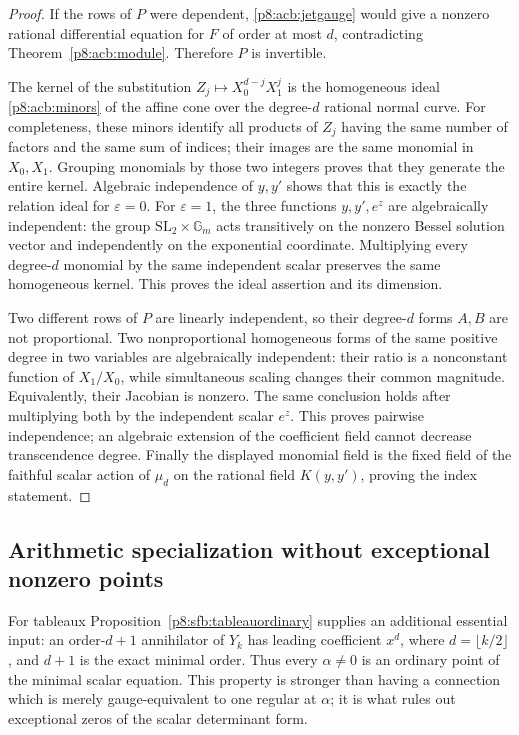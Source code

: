 \documentclass[11pt,a4paper]{article}
\theoremstyle{definition}
\theoremstyle{remark}
\numberwithin{equation}{section}
\begin{document}
\begin{proof}
If the rows of $P$ were dependent, \eqref{p8:acb:jetgauge} would give
a nonzero rational differential equation for $F$ of order at most
$d$, contradicting Theorem~\ref{p8:acb:module}.  Therefore $P$ is
invertible.

The kernel of the substitution
$Z_j\mapsto X_0^{d-j}X_1^j$ is the homogeneous ideal
\eqref{p8:acb:minors} of the affine cone over the degree-$d$ rational
normal curve.  For completeness, these minors identify all
products of $Z_j$ having the same number of factors and the same
sum of indices; their images are the same monomial in $X_0,X_1$.
Grouping monomials by those two integers proves that they generate
the entire kernel.  Algebraic independence of $y,y'$ shows that
this is exactly the relation ideal for $\varepsilon=0$.
For $\varepsilon=1$, the three functions $y,y',e^z$ are
algebraically independent: the group
$\mathrm{SL}_2\times\mathbb G_m$ acts transitively on the
nonzero Bessel solution vector and independently on the
exponential coordinate.  Multiplying every degree-$d$ monomial
by the same independent scalar preserves the same homogeneous
kernel.  This proves the ideal assertion and its dimension.

Two different rows of $P$ are linearly independent, so their
degree-$d$ forms $A,B$ are not proportional.  Two nonproportional
homogeneous forms of the same positive degree in two variables
are algebraically independent: their ratio is a nonconstant
function of $X_1/X_0$, while simultaneous scaling changes their
common magnitude.  Equivalently, their Jacobian is nonzero.
The same conclusion holds after multiplying both by the
independent scalar $e^z$.  This proves pairwise independence;
an algebraic extension of the coefficient field cannot decrease
transcendence degree.  Finally the displayed monomial field is
the fixed field of the faithful scalar action of $\mu_d$ on
the rational field $K(y,y')$, proving the index statement.
\end{proof}

\subsection{Arithmetic specialization without exceptional nonzero points}

For tableaux Proposition~\ref{p8:sfb:tableauordinary} supplies an
additional essential input: an order-$d+1$ annihilator of $Y_k$
has leading coefficient $x^d$, where $d=\lfloor k/2\rfloor$,
and $d+1$ is the exact minimal order.  Thus every
$\alpha\ne0$ is an ordinary point of the minimal scalar equation.
This property is stronger than having a connection which is
merely gauge-equivalent to one regular at $\alpha$; it is what
rules out exceptional zeros of the scalar determinant form.
\end{document}
